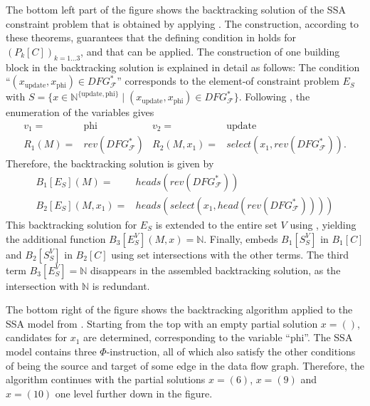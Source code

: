     The bottom left part of the figure shows the backtracking solution
    of the SSA constraint problem that is obtained by applying
    .
    The construction, according to these theorems, guarantees that the defining
    condition in  holds for $(P_k[C])_{k=1\dots3}$, and
    that  can be applied.
    The construction of one building block in the backtracking solution is
    explained in detail as follows:
    The condition ``$(x_\text{update},x_\text{phi})\in DFG_\mathcal F^*$''
    corresponds to the \mbox{element-of} constraint problem $E_S$ with
    $S=\{x\in\mathbb N^{\{\text{update},\text{phi}\}}\mid (x_\text{update},x_\text{phi})\in DFG_\mathcal F^*\}$.
    Following , the enumeration of the variables gives
    \begin{align*}
    v_1={}&\text{phi}&v_2={}&\text{update}\\
    R_1(M)={}&rev(DFG_\mathcal F^*)&
    R_2(M,x_1)={}&select(x_1,rev(DFG_\mathcal F^*)).
    \end{align*}
    Therefore, the backtracking solution is given by
    \begin{align*}
        B_1[E_S](M)={}&heads(rev(DFG_\mathcal F^*))\\
        B_2[E_S](M,x_1)={}&heads(select(x_1,head(rev(DFG_\mathcal F^*))))
    \end{align*}
    This backtracking solution for $E_S$ is extended to the entire set $V$ using
    , yielding the additional function
    $B_3[E_S^V](M,x)=\mathbb N$.
    Finally,  embeds $B_1[S_S^V]$ in $B_1[C]$ and
    $B_2[S_S^V]$ in $B_2[C]$ using set intersections with the other terms.
    The third term $B_3[E_S^V]=\mathbb N$ disappears in the assembled
    backtracking solution, as the intersection with $\mathbb N$ is redundant.

    The bottom right of the figure shows the backtracking algorithm applied to
    the SSA model from .
    Starting from the top with an empty partial solution $x=()$, candidates for
    $x_1$ are determined, corresponding to the variable ``phi''.
    The SSA model contains three $\Phi$-instruction, all of which also satisfy
    the other conditions of being the source and target of some edge in the data
    flow graph.
    Therefore, the algorithm continues with the partial solutions $x=(6)$,
    $x=(9)$ and $x=(10)$ one level further down in the figure.

